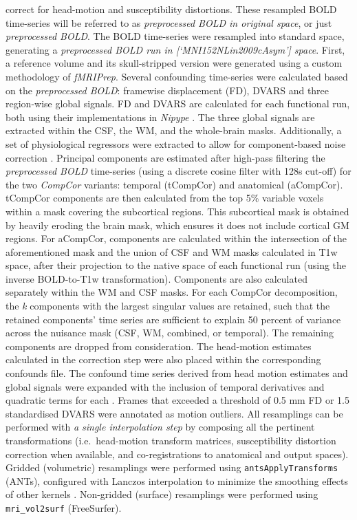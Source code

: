 \documentclass[]{article}
\begin{document}
\begin{description}
correct for head-motion and susceptibility distortions. These resampled
BOLD time-series will be referred to as \emph{preprocessed BOLD in
original space}, or just \emph{preprocessed BOLD}. The BOLD time-series
were resampled into standard space, generating a \emph{preprocessed BOLD
run in {[}`MNI152NLin2009cAsym'{]} space}. First, a reference volume and
its skull-stripped version were generated using a custom methodology of
\emph{fMRIPrep}. Several confounding time-series were calculated based
on the \emph{preprocessed BOLD}: framewise displacement (FD), DVARS and
three region-wise global signals. FD and DVARS are calculated for each
functional run, both using their implementations in \emph{Nipype}
\citep[following the definitions by][]{power_fd_dvars}. The three global
signals are extracted within the CSF, the WM, and the whole-brain masks.
Additionally, a set of physiological regressors were extracted to allow
for component-based noise correction \citep[\emph{CompCor},][]{compcor}.
Principal components are estimated after high-pass filtering the
\emph{preprocessed BOLD} time-series (using a discrete cosine filter
with 128s cut-off) for the two \emph{CompCor} variants: temporal
(tCompCor) and anatomical (aCompCor). tCompCor components are then
calculated from the top 5\% variable voxels within a mask covering the
subcortical regions. This subcortical mask is obtained by heavily
eroding the brain mask, which ensures it does not include cortical GM
regions. For aCompCor, components are calculated within the intersection
of the aforementioned mask and the union of CSF and WM masks calculated
in T1w space, after their projection to the native space of each
functional run (using the inverse BOLD-to-T1w transformation).
Components are also calculated separately within the WM and CSF masks.
For each CompCor decomposition, the \emph{k} components with the largest
singular values are retained, such that the retained components' time
series are sufficient to explain 50 percent of variance across the
nuisance mask (CSF, WM, combined, or temporal). The remaining components
are dropped from consideration. The head-motion estimates calculated in
the correction step were also placed within the corresponding confounds
file. The confound time series derived from head motion estimates and
global signals were expanded with the inclusion of temporal derivatives
and quadratic terms for each \citep{confounds_satterthwaite_2013}.
Frames that exceeded a threshold of 0.5 mm FD or 1.5 standardised DVARS
were annotated as motion outliers. All resamplings can be performed with
\emph{a single interpolation step} by composing all the pertinent
transformations (i.e.~head-motion transform matrices, susceptibility
distortion correction when available, and co-registrations to anatomical
and output spaces). Gridded (volumetric) resamplings were performed
using \texttt{antsApplyTransforms} (ANTs), configured with Lanczos
interpolation to minimize the smoothing effects of other kernels
\citep{lanczos}. Non-gridded (surface) resamplings were performed using
\texttt{mri\_vol2surf} (FreeSurfer).
\end{description}
\end{document}
